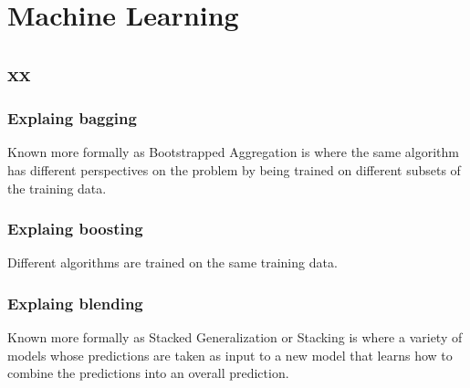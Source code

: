 \chapter{   Machine Learning}
\graphicspath{{./images/machine_learning/}}

\section{xx}

\subsection{Explaing bagging}
Known more formally as Bootstrapped Aggregation is where the same algorithm has different perspectives on the problem by being trained on different subsets of the training data.

\subsection{Explaing boosting}
Different algorithms are trained on the same training data.

\subsection{Explaing blending}
Known more formally as Stacked Generalization or Stacking is where a variety of models whose predictions are taken as input to a new model that learns how to combine the predictions into an overall prediction.
